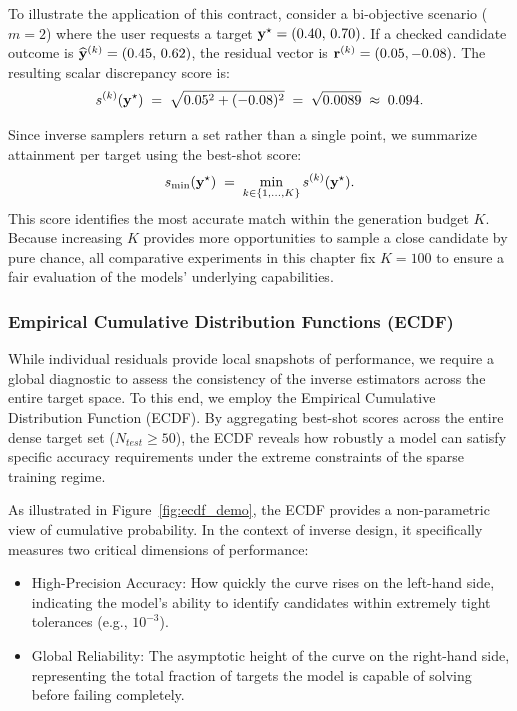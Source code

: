 To illustrate the application of this contract, consider a bi-objective scenario ($m=2$) where the user requests a target $\mathbf{y}^{\star}=(0.40,\,0.70)$. If a checked candidate outcome is $\widehat{\mathbf{y}}^{(k)}=(0.45,\,0.62)$, the residual vector is $\mathbf{r}^{(k)} = (0.05, -0.08)$. The resulting scalar discrepancy score is:
\begin{equation}
  s^{(k)}(\mathbf{y}^{\star})
  \;=\;
  \sqrt{0.05^{2}+(-0.08)^{2}}
  \;=\;
  \sqrt{0.0089}
  \;\approx\;
  0.094.
\end{equation}

Since inverse samplers return a set rather than a single point, we summarize attainment per target using the best-shot score:
\begin{equation}
  s_{\min}(\mathbf{y}^{\star}) 
  \;=\; 
  \min_{k\in\{1,\dots,K\}} s^{(k)}(\mathbf{y}^{\star}).
  \label{eq:objective_best_shot}
\end{equation}
This score identifies the most accurate match within the generation budget $K$. Because increasing $K$ provides more opportunities to sample a close candidate by pure chance, all comparative experiments in this chapter fix $K=100$ to ensure a fair evaluation of the models' underlying capabilities.

\subsubsection{Empirical Cumulative Distribution Functions (ECDF)}\label{subsubsec:objective_ecdf}

While individual residuals provide local snapshots of performance, we require a global diagnostic to assess the consistency of the inverse estimators across the entire target space. To this end, we employ the Empirical Cumulative Distribution Function (ECDF). By aggregating best-shot scores across the entire dense target set ($N_{test} \ge 50$), the ECDF reveals how robustly a model can satisfy specific accuracy requirements under the extreme constraints of the sparse training regime. 

As illustrated in Figure~\ref{fig:ecdf_demo}, the ECDF provides a non-parametric view of cumulative probability. In the context of inverse design, it specifically measures two critical dimensions of performance:
\begin{itemize}
    \item High-Precision Accuracy: How quickly the curve rises on the left-hand side, indicating the model's ability to identify candidates within extremely tight tolerances (e.g., $10^{-3}$).
    \item Global Reliability: The asymptotic height of the curve on the right-hand side, representing the total fraction of targets the model is capable of solving before failing completely.
\end{itemize}

